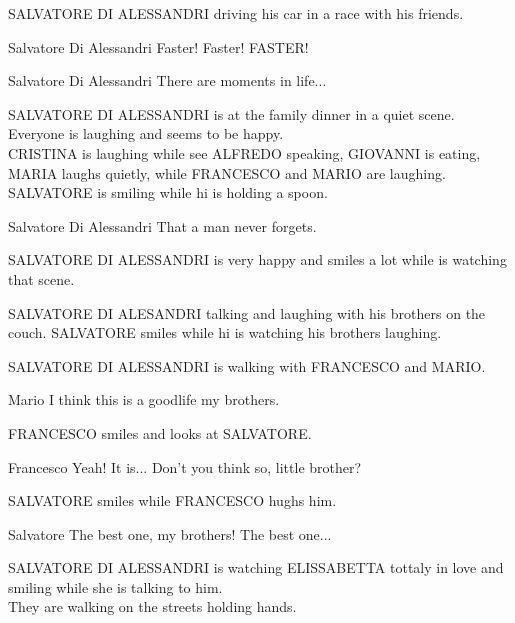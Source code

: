 \documentclass{screenplay}[2020/03/26]
\begin{document}

\fadeout
{}
SALVATORE DI ALESSANDRI driving his car in a race with his friends.
\begin{dialogue}[euphoric]{Salvatore Di Alessandri}
Faster! Faster! FASTER!
\end{dialogue}

\begin{dialogue}[narrating]{Salvatore Di Alessandri}
There are moments in life...
\end{dialogue}


\fadeout
{}
SALVATORE DI ALESSANDRI is at the family dinner in a quiet scene. Everyone is laughing and seems to be happy.
\\CRISTINA is laughing while see ALFREDO speaking, GIOVANNI is eating, MARIA laughs quietly, while FRANCESCO and MARIO are laughing. SALVATORE is smiling while hi is holding a spoon.
\fadein

\begin{dialogue}[narrating]{Salvatore Di Alessandri}
That a man never forgets.
\end{dialogue}

SALVATORE DI ALESSANDRI is very happy and smiles a lot while is watching that scene.


SALVATORE DI ALESANDRI talking and laughing with his brothers on the couch.
SALVATORE smiles while hi is watching his brothers laughing.


\fadein
{}
SALVATORE DI ALESSANDRI is walking with FRANCESCO and MARIO.
\begin{dialogue}{Mario}
I think this is a goodlife my brothers.
\end{dialogue}
FRANCESCO smiles and looks at SALVATORE.
\begin{dialogue}[happy]{Francesco}
Yeah! It is... Don't you think so, little brother?
\end{dialogue}
SALVATORE smiles while FRANCESCO hughs him.
\begin{dialogue}[smiling]{Salvatore}
The best one, my brothers! The best one...
\end{dialogue}


\fadein
{}
SALVATORE DI ALESSANDRI is watching ELISSABETTA tottaly in love and smiling while she is talking to him.
\\They are walking on the streets holding hands.
\fadein
\end{document}
